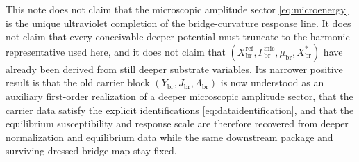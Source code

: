 \documentclass[11pt]{article}
\newcommand{\RespCarrier}{Y_{\mathrm{br}}}
\newcommand{\RespFlux}{J_{\mathrm{br}}}
\newcommand{\RespCompat}{\Lambda_{\mathrm{br}}}
\newcommand{\RespMicroEq}{X_{\mathrm{br}}^{\ast}}
\newcommand{\RespMicroRef}{X_{\mathrm{br}}^{\mathrm{ref}}}
\newcommand{\RespMicroFluxCoeff}{\Gamma_{\mathrm{br}}^{\mathrm{mic}}}
\newcommand{\RespMicroGap}{\mu_{\mathrm{br}}}
\begin{document}
This note does not claim that the microscopic amplitude sector \eqref{eq:microenergy} is the unique ultraviolet completion of the bridge-curvature response line. It does not claim that every conceivable deeper potential must truncate to the harmonic representative used here, and it does not claim that \((\RespMicroRef,\RespMicroFluxCoeff,\RespMicroGap,\RespMicroEq)\) have already been derived from still deeper substrate variables. Its narrower positive result is that the old carrier block \((\RespCarrier,\RespFlux,\RespCompat)\) is now understood as an auxiliary first-order realization of a deeper microscopic amplitude sector, that the carrier data satisfy the explicit identifications \eqref{eq:dataidentification}, and that the equilibrium susceptibility and response scale are therefore recovered from deeper normalization and equilibrium data while the same downstream package and surviving dressed bridge map stay fixed.
\end{document}

